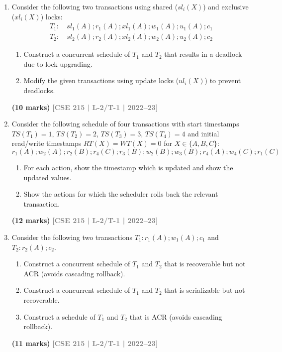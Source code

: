\documentclass[12pt,a3paper]{article}
\newcommand{\yr}[1]{\hfill\textcolor{gray}{\small\textbf{[#1]}}}
\newcommand{\mk}[1]{\textcolor{orange!70!black}{\small\textbf{(#1 marks)}}}
\begin{document}
\begin{enumerate}
\item Consider the following two transactions using shared ($sl_i(X)$) and exclusive ($xl_i(X)$) locks:
\begin{align*}
T_1\colon &\ sl_1(A); r_1(A); xl_1(A); w_1(A); u_1(A); c_1\\
T_2\colon &\ sl_2(A); r_2(A); xl_2(A); w_2(A); u_2(A); c_2
\end{align*}
\begin{enumerate}
  \item Construct a concurrent schedule of $T_1$ and $T_2$ that results in a deadlock due to lock upgrading.
  \item Modify the given transactions using update locks ($ul_i(X)$) to prevent deadlocks.
\end{enumerate}
  \mk{10} \yr{CSE 215 | L-2/T-1 | 2022--23}

\item Consider the following schedule of four transactions with start timestamps $TS(T_1)=1$, $TS(T_2)=2$, $TS(T_3)=3$, $TS(T_4)=4$ and initial read/write timestamps $RT(X)=WT(X)=0$ for $X \in \{A,B,C\}$:
\[r_1(A); w_2(A); r_2(B); r_4(C); r_3(B); w_2(B); w_3(B); r_4(A); w_4(C); r_1(C)\]
\begin{enumerate}
  \item For each action, show the timestamp which is updated and show the updated values.
  \item Show the actions for which the scheduler rolls back the relevant transaction.
\end{enumerate}
  \mk{12} \yr{CSE 215 | L-2/T-1 | 2022--23}

\item Consider the following two transactions $T_1\colon r_1(A); w_1(A); c_1$ and $T_2\colon r_2(A); c_2$.
\begin{enumerate}
  \item Construct a concurrent schedule of $T_1$ and $T_2$ that is recoverable but not ACR (avoids cascading rollback).
  \item Construct a concurrent schedule of $T_1$ and $T_2$ that is serializable but not recoverable.
  \item Construct a schedule of $T_1$ and $T_2$ that is ACR (avoids cascading rollback).
\end{enumerate}
  \mk{11} \yr{CSE 215 | L-2/T-1 | 2022--23}


\end{enumerate}
\end{document}
